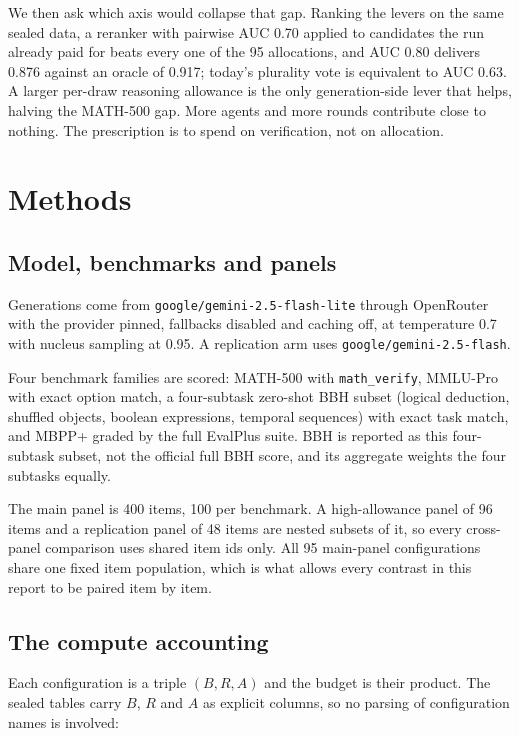 \documentclass[11pt]{article}
\begin{document}
We then ask which axis would collapse that gap. Ranking the levers on the same sealed data, a
reranker with pairwise AUC 0.70 applied to candidates the run already paid for beats every one of
the 95 allocations, and AUC 0.80 delivers 0.876 against an oracle of 0.917; today's plurality vote
is equivalent to AUC 0.63. A larger per-draw reasoning allowance is the only generation-side lever
that helps, halving the MATH-500 gap. More agents and more rounds contribute close to nothing.
The prescription is to spend on verification, not on allocation.

\section{Methods}

\subsection{Model, benchmarks and panels}

Generations come from \texttt{google/gemini-2.5-flash-lite} through OpenRouter with the provider
pinned, fallbacks disabled and caching off, at temperature 0.7 with nucleus sampling at 0.95. A replication arm
uses \texttt{google/gemini-2.5-flash}.

Four benchmark families are scored: MATH-500 with \texttt{math\_verify}, MMLU-Pro with exact
option match, a four-subtask zero-shot BBH subset (logical deduction, shuffled objects, boolean
expressions, temporal sequences) with exact task match, and MBPP+ graded by the full EvalPlus
suite. BBH is reported as this four-subtask subset, not the official full BBH score, and its
aggregate weights the four subtasks equally.

The main panel is 400 items, 100 per benchmark. A high-allowance panel of 96 items and a
replication panel of 48 items are nested subsets of it, so every cross-panel comparison uses
shared item ids only. All 95 main-panel configurations share one fixed item population, which is
what allows every contrast in this report to be paired item by item.

\subsection{The compute accounting}

Each configuration is a triple $(B, R, A)$ and the budget is their product. The sealed tables
carry $B$, $R$ and $A$ as explicit columns, so no parsing of configuration names is involved:
\end{document}

